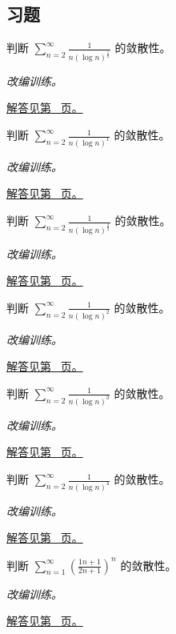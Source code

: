 \documentclass[12pt,fontset=fandol]{ctexart}
\begin{document}
\subsection{习题}
\begin{example}[调和级数的对数修正]\label{ex:c25q1}
判断 $\displaystyle\sum_{n=2}^\infty\frac1{n(\log n)^{\frac{1}{2}}}$ 的敛散性。
\par\textit{改编训练。}\par\hyperref[ans:c25q1]{解答见第~\pageref{ans:c25q1} 页。}
\end{example}
\begin{example}[调和级数的对数修正]\label{ex:c25q2}
判断 $\displaystyle\sum_{n=2}^\infty\frac1{n(\log n)^{1}}$ 的敛散性。
\par\textit{改编训练。}\par\hyperref[ans:c25q2]{解答见第~\pageref{ans:c25q2} 页。}
\end{example}
\begin{example}[调和级数的对数修正]\label{ex:c25q3}
判断 $\displaystyle\sum_{n=2}^\infty\frac1{n(\log n)^{\frac{3}{2}}}$ 的敛散性。
\par\textit{改编训练。}\par\hyperref[ans:c25q3]{解答见第~\pageref{ans:c25q3} 页。}
\end{example}
\begin{example}[调和级数的对数修正]\label{ex:c25q4}
判断 $\displaystyle\sum_{n=2}^\infty\frac1{n(\log n)^{2}}$ 的敛散性。
\par\textit{改编训练。}\par\hyperref[ans:c25q4]{解答见第~\pageref{ans:c25q4} 页。}
\end{example}
\begin{example}[调和级数的对数修正]\label{ex:c25q5}
判断 $\displaystyle\sum_{n=2}^\infty\frac1{n(\log n)^{3}}$ 的敛散性。
\par\textit{改编训练。}\par\hyperref[ans:c25q5]{解答见第~\pageref{ans:c25q5} 页。}
\end{example}
\begin{example}[调和级数的对数修正]\label{ex:c25q6}
判断 $\displaystyle\sum_{n=2}^\infty\frac1{n(\log n)^{4}}$ 的敛散性。
\par\textit{改编训练。}\par\hyperref[ans:c25q6]{解答见第~\pageref{ans:c25q6} 页。}
\end{example}
\begin{example}[根值判别的直接使用]\label{ex:c25q7}
判断 $\displaystyle\sum_{n=1}^\infty\left(\frac{1n+1}{2n+1}\right)^n$ 的敛散性。
\par\textit{改编训练。}\par\hyperref[ans:c25q7]{解答见第~\pageref{ans:c25q7} 页。}
\end{example}
\end{document}
